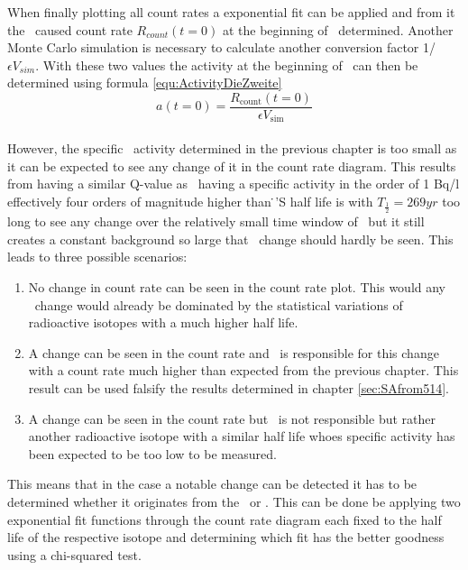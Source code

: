 When finally plotting all count rates a exponential fit can be applied and from it the \Kr\ caused count rate $R_{count}(t=0)$ at the beginning of \PII\ determined.
Another Monte Carlo simulation is necessary to calculate another conversion factor 1/$\epsilon V_{sim}$.
With these two values the activity at the beginning of \PII\ can then be determined using formula \ref{equ:ActivityDieZweite}
\begin{equation}
a(t=0) = \frac{R_{\mathrm{count}}(t=0)}{\epsilon V_{\mathrm{sim}}}
\label{equ:ActivityDieZweite}
\end{equation}
\\

However, the specific \Kr\ activity determined in the previous chapter is too small as it can be expected to see any change of it in the count rate diagram.
This results from  having a similar Q-value as \Kr\ having a specific activity in the order of 1 Bq/l effectively four orders of magnitude higher than \Kr\.
'S half life is with $T_{\frac{1}{2}} = 269\unit{yr}$ too long to see any change over the relatively small time window of \PII\ but it still creates a constant background so large that \Kr\ change should hardly be seen.
This leads to three possible scenarios:
\begin{enumerate}
	\item No change in count rate can be seen in the count rate plot. 
	This would any \Kr\ change would already be dominated by the statistical variations of radioactive isotopes with a much higher half life.
	\item A change can be seen in the count rate and \Kr\ is responsible for this change with a count rate much higher than expected from the previous chapter.
	This result can be used falsify the results determined in chapter \ref{sec:SAfrom514}.
	\item A change can be seen in the count rate but \Kr\ is not responsible but rather another radioactive isotope with a similar half life whoes specific activity has been expected to be too low to be measured.
	
\end{enumerate}
This means that in the case a notable change can be detected it has to be determined whether it originates from the \Kr\ or .
This can be done be applying two exponential fit functions through the count rate diagram each fixed to the half life of the respective isotope and determining which fit has the better goodness using a chi-squared test.
\\

